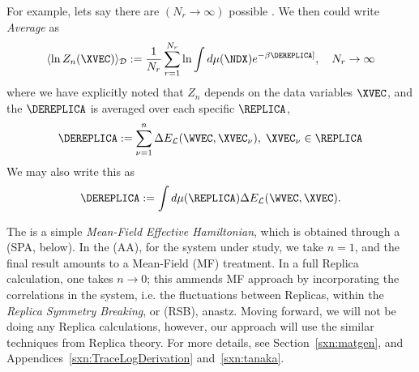 For example, lets say there are $(N_r\rightarrow\infty)$ possible \Replicas.
We then could write
\emph{\Replica Average} as
\begin{align}
  \label{eqn:logZreplica}
  \langle \ln Z_{n}(\XVEC) \rangle_{\mathcal{D}}
  :=
  \dfrac{1}{N_r}\sum_{r=1}^{N_r}\ln\int d\mu(\NDX) e^{-\beta \DEREPLICA]},
  \quad  %
  N_r\rightarrow\infty
\end{align}
where we have explicitly noted that $Z_{n}$ depends on the data variables $\XVEC$,
and the \TotalEffectivePotential $\DEREPLICA$ is averaged over each specific \Replica $\REPLICA$,
\begin{align}
\DEREPLICA:=\sum_{\nu=1}^{n}\Delta E_{\mathcal{L}}(\WVEC,\XVEC_{\nu}),
\;
\XVEC_{\nu}\in\REPLICA
\end{align}
We may also write this as
\begin{align}
\DEREPLICA:=\int d\mu(\REPLICA)\Delta E_{\mathcal{L}}(\WVEC,\XVEC)  .
\end{align}

The \EffectivePotential is a simple \emph{Mean-Field Effective Hamiltonian}, which is obtained through
a \emph{\SaddlePointApproximation} (SPA, below).
In the \AnnealedApproximation (AA), for the system under study,
we take $n=1$, and the final result amounts to a Mean-Field (MF) treatment.
In a full Replica calculation, one takes $n\rightarrow 0$; this ammends MF approach
by incorporating the correlations in the system, i.e. the fluctuations between Replicas,
within the \emph{Replica Symmetry Breaking}, or (RSB), anastz.\cite{Parisi_1980}
Moving forward, we will not be doing any Replica calculations,
however, our approach will use the similar  techniques from Replica theory.
For more details, see Section~\ref{sxn:matgen}, and Appendices~\ref{sxn:TraceLogDerivation} and~\ref{sxn:tanaka}.

